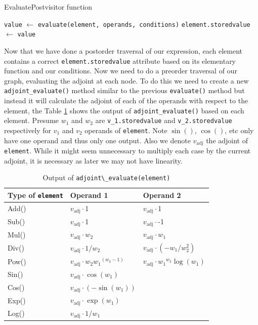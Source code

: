 \documentclass{article}
\begin{document}
\begin{algorithm}[h!]
\caption{EvaluatePostvisitor function}\label{EvaluatePostvisitor}
\begin{algorithmic}[1]
\State \verb|value| $\gets$ \verb|evaluate(element, operands, conditions)|
\State \verb|element.storedvalue| $\gets$ \verb|value|
\EndFor
\EndProcedure
\end{algorithmic}
\end{algorithm}

Now that we have done a postorder traversal of our expression, each element contains a correct \verb|element.storedvalue| attribute based on its elementary function and our conditions. Now we need to do a preorder traversal of our graph, evaluating the adjoint at each node. To do this we need to create a new \verb|adjoint_evaluate()| method similar to the previous \verb|evaluate()| method but instead it will calculate the adjoint of each of the operands with respect to the element, the Table \ref{tab:AdjEval} shows the output of \verb|adjoint_evaluate()| based on each element. Presume $w_1$ and $w_2$ are \verb|v_1.storedvalue| and \verb|v_2.storedvalue| respectively for $v_1$ and $v_2$ operands of \verb|element|. Note $\sin()$, $\cos()$, etc only have one operand and thus only one output. Also we denote $v_\mathrm{adj}$ the adjoint of \verb|element|. While it might seem unnecessary to multiply each case by the current adjoint, it is necessary as later we may not have linearity.

\begin{table}[h!]
    \centering
    \begin{tabular}{|lll|}
        \hline
        Type of \verb|element| & Operand 1  & Operand 2 \\
        \hline
        Add() & $v_\mathrm{adj}\cdot $1 & $v_\mathrm{adj}\cdot $1 \\
        Sub() & $v_\mathrm{adj}\cdot $1 & $v_\mathrm{adj}\cdot $-1 \\
        Mul() & $v_\mathrm{adj}\cdot w_2$ & $v_\mathrm{adj}\cdot w_1$ \\
        Div() & $v_\mathrm{adj}\cdot 1/w_2$ & $v_\mathrm{adj}\cdot (-w_1/w_2^2)$ \\
        Pow() & $v_\mathrm{adj}\cdot w_2{w_1}^{(w_2-1)}$ & $v_\mathrm{adj}\cdot {w_1}^{w_2}\log(w_1)$ \\
        \hdashline
        Sin() & $v_\mathrm{adj}\cdot \cos(w_1)$ &  \\
        Cos() & $v_\mathrm{adj}\cdot (-\sin(w_1))$ &  \\
        Exp() & $v_\mathrm{adj}\cdot \exp(w_1)$ &  \\
        Log() & $v_\mathrm{adj}\cdot 1/w_1$ &  \\
        \hline
    \end{tabular}
    \caption{Output of \verb|adjoint\_evaluate(element)|}
    \label{tab:AdjEval}
\end{table}
\end{document}
